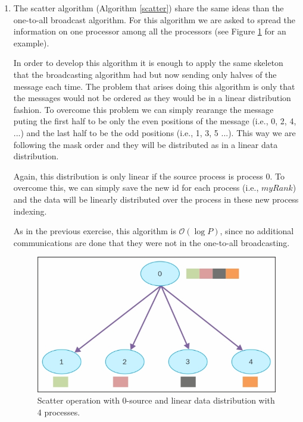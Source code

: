 \documentclass{article}
\begin{document}
\begin{enumerate}
\begin{enumerate}
\item The scatter algorithm (Algorithm \ref{scatter}) share the same ideas than the one-to-all broadcast algorithm. For this algorithm we are asked to spread the information on one processor among all the processors (see Figure \ref{fig:scatter} for an example).

In order to develop this algorithm it is enough to apply the same skeleton that the broadcasting algorithm had but now sending only halves of the message each time. The problem that arises doing this algorithm is only that the messages would not be ordered as they would be in a linear distribution fashion. To overcome this problem we can simply rearange the message puting the first half to be only the even positions of the message (i.e., 0, 2, 4, ...) and the last half to be the odd positions (i.e., 1, 3, 5 ...). This way we are following the mask order and they will be distributed as in a linear data distribution.

Again, this distribution is only linear if the source process is process 0. To overcome this, we can simply save the new id for each process (i.e., $myRank$) and the data will be linearly distributed over the process in these new process indexing.

As in the previous exercise, this algorithm is $\mathcal{O}(\log P)$, since no additional communications are done that they were not in the one-to-all broadcasting.

\begin{figure}[H]
\centering
\includegraphics[scale=1.5]{scatter_ex.jpg}
\caption{Scatter operation with 0-source and linear data distribution with 4 processes.}
\label{fig:scatter}
\end{figure}


\end{enumerate}
\end{enumerate}
\end{document}
